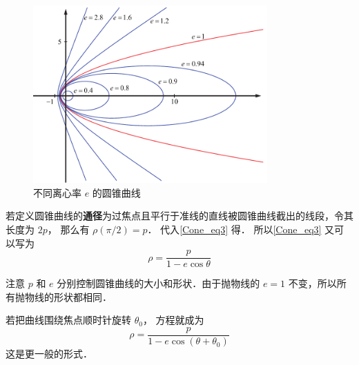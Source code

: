\begin{figure}[h]
\vskip0pt
\centering
\includegraphics[width=0.8\textwidth]{./figures/Cone2.pdf}
\caption{不同离心率 $e$ 的圆锥曲线}
\vspace{0pt}
\end{figure}
若定义圆锥曲线的\textbf{通径}为过焦点且平行于准线的直线被圆锥曲线截出的线段，令其长度为 $2p$， 那么有 $\rho (\pi /2) = p$． 代入\autoref{Cone_eq3} 得． 所以\autoref{Cone_eq3} 又可以写为
\begin{equation}\label{Cone_eq4}
\rho  = \frac{p}{{1 - e\cos \theta }}
\end{equation}


注意 $p$ 和 $e$ 分别控制圆锥曲线的大小和形状．由于抛物线的 $e = 1$ 不变，所以所有抛物线的形状都相同．

若把曲线围绕焦点顺时针旋转 ${\theta _0}$， 方程就成为
\begin{equation}\label{Cone_eq5}
\rho  = \frac{p}{{1 - e\cos \left( {\theta  + {\theta _0}} \right)}}
\end{equation}
这是更一般的形式．




